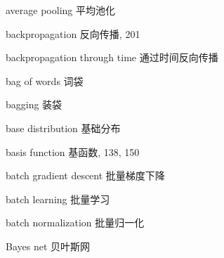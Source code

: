average pooling 平均池化\par
backpropagation 反向传播, 201\par
backpropagation through time 通过时间反向传播\par
bag of words 词袋\par
bagging 装袋\par
base distribution 基础分布\par
basis function 基函数, 138, 150\par
batch gradient descent 批量梯度下降\par
batch learning 批量学习\par
batch normalization 批量归一化\par
Bayes net 贝叶斯网\par


